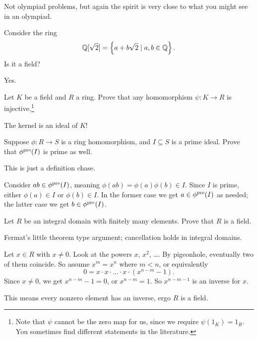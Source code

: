 \section{\problemhead}
Not olympiad problems, but again the spirit is very close
to what you might see in an olympiad.

\begin{problem}
	Consider the ring
	\[ \mathbb Q[\sqrt2] = \left\{ a + b\sqrt2 \mid a,b \in \mathbb Q \right\}. \]
	Is it a field?
	\begin{hint}
		Yes.
	\end{hint}
\end{problem}

\begin{problem}
	\label{prob:field_hom}
	Let $K$ be a field and $R$ a ring.
	Prove that any homomorphism $\psi \colon K \to R$
	is injective.\footnote{Note that $\psi$
		cannot be the zero map for us,
		since we require $\psi(1_K) = 1_R$.
		You sometimes find different statements in the literature.}
	\begin{hint}
		The kernel is an ideal of $K$!
	\end{hint}
\end{problem}

\begin{sproblem}
	\label{prob:prime_preimage}
	Suppose $\phi \colon R \to S$ is a ring homomorphism,
	and $I \subseteq S$ is a prime ideal.
	Prove that $\phi^{\text{pre}}(I)$ is prime as well.
	\begin{hint}
		This is just a definition chase.
	\end{hint}
	\begin{sol}
		Consider $ab \in \phi^{\text{pre}}(I)$,
		meaning $\phi(ab) = \phi(a) \phi(b) \in I$.
		Since $I$ is prime, either $\phi(a) \in I$ or $\phi(b) \in I$.
		In the former case we get $a \in \phi^{\text{pre}}(I)$ as needed;
		the latter case we get $b \in \phi^{\text{pre}}(I)$.
	\end{sol}
\end{sproblem}

\begin{sproblem}
	\gim
	Let $R$ be an integral domain with finitely many elements.
	Prove that $R$ is a field.
	\label{prob:finite_domain_field}
	\begin{hint}
		Fermat's little theorem type argument;
		cancellation holds in integral domains.
	\end{hint}
	\begin{sol}
		Let $x \in R$ with $x \neq 0$.
		Look at the powers $x$, $x^2$, \dots.
		By pigeonhole, eventually two of them coincide.
		So assume $x^m = x^n$ where $m < n$, or equivalently
		\[ 0  = x \cdot x \cdot \dots \cdot x
			\cdot \left( x^{n-m} - 1 \right). \]
		Since $x \ne 0$, we get $x^{n-m} - 1 = 0$,
		or $x^{n-m} = 1$.
		So $x^{n-m-1}$ is an inverse for $x$.

		This means every nonzero element has an inverse,
		ergo $R$ is a field.
	\end{sol}
\end{sproblem}

